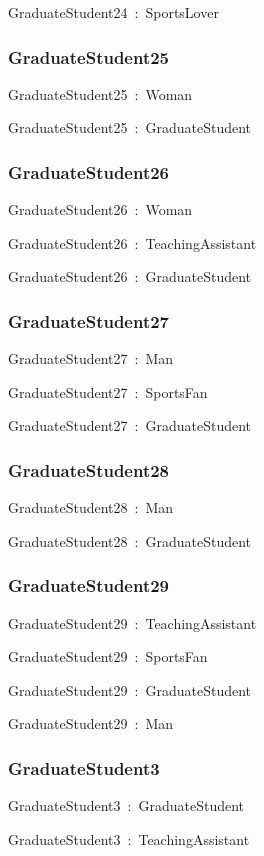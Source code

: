 \documentclass{article}
\begin{document}
GraduateStudent24~:~SportsLover

\subsubsection*{GraduateStudent25}

GraduateStudent25~:~Woman

GraduateStudent25~:~GraduateStudent

\subsubsection*{GraduateStudent26}

GraduateStudent26~:~Woman

GraduateStudent26~:~TeachingAssistant

GraduateStudent26~:~GraduateStudent

\subsubsection*{GraduateStudent27}

GraduateStudent27~:~Man

GraduateStudent27~:~SportsFan

GraduateStudent27~:~GraduateStudent

\subsubsection*{GraduateStudent28}

GraduateStudent28~:~Man

GraduateStudent28~:~GraduateStudent

\subsubsection*{GraduateStudent29}

GraduateStudent29~:~TeachingAssistant

GraduateStudent29~:~SportsFan

GraduateStudent29~:~GraduateStudent

GraduateStudent29~:~Man

\subsubsection*{GraduateStudent3}

GraduateStudent3~:~GraduateStudent

GraduateStudent3~:~TeachingAssistant
\end{document}
